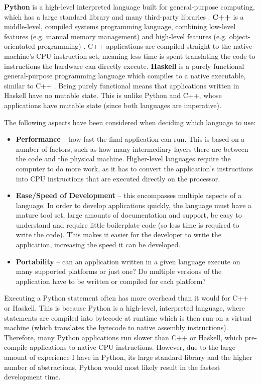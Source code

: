 \textbf{Python} is a high-level interpreted language built for general-purpose computing, which has a large standard library and many third-party libraries \cite{python}. \textbf{C++} is a middle-level, compiled systems programming language, combining low-level features (e.g. manual memory management) and high-level features (e.g. object-orientated programming) \cite{cpp}. C++ applications are compiled straight to the native machine's CPU instruction set, meaning less time is spent translating the code to instructions the hardware can directly execute. \textbf{Haskell} is a purely functional general-purpose programming language which compiles to a native executable, similar to C++ \cite{haskell}. Being purely functional means that applications written in Haskell have no mutable state. This is unlike Python and C++, whose applications have mutable state (since both languages are imperative).

The following aspects have been considered when deciding which language to use:
\begin{itemize}
	\item \textbf{Performance} -- how fast the final application can run. This is based on a number of factors, such as how many intermediary layers there are between the code and the physical machine. Higher-level languages require the computer to do more work, as it has to convert the application's instructions into CPU instructions that are executed directly on the processor.
	\item \textbf{Ease/Speed of Development} -- this encompasses multiple aspects of a language. In order to develop applications quickly, the language must have a mature tool set, large amounts of documentation and support, be easy to understand and require little boilerplate code (so less time is required to write the code). This makes it easier for the developer to write the application, increasing the speed it can be developed.
	\item \textbf{Portability} -- can an application written in a given language execute on many supported platforms or just one? Do multiple versions of the application have to be written or compiled for each platform?
\end{itemize}
 
Executing a Python statement often has more overhead than it would for C++ or Haskell. This is because Python is a high-level, interpreted language, where statements are compiled into bytecode at runtime which is then run on a virtual machine (which translates the bytecode to native assembly instructions). Therefore, many Python applications run slower than C++ or Haskell, which pre-compile applications to native CPU instructions. However, due to the large amount of experience I have in Python, its large standard library and the higher number of abstractions, Python would most likely result in the fastest development time. 

